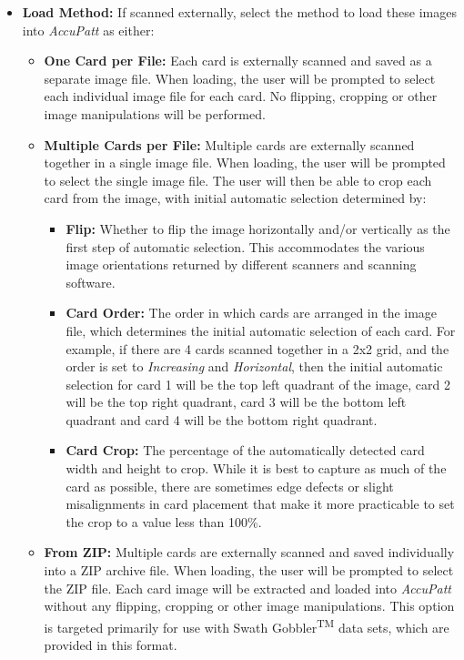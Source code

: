 \documentclass[10pt,letterpaper,titlepage]{article}
\begin{document}
    \begin{itemize}
        \item \textbf{Load Method:} If scanned externally, select the method to load these images into \textit{AccuPatt} as either:
        \begin{itemize}
            \item \textbf{One Card per File:} Each card is externally scanned and saved as a separate image file. When loading, the user will be prompted to select each individual image file for each card. No flipping, cropping or other image manipulations will be performed.
            \item \textbf{Multiple Cards per File:} Multiple cards are externally scanned together in a single image file. When loading, the user will be prompted to select the single image file. The user will then be able to crop each card from the image, with initial automatic selection determined by:
            \begin{itemize}
                \item \textbf{Flip:} Whether to flip the image horizontally and/or vertically as the first step of automatic selection. This accommodates the various image orientations returned by different scanners and scanning software.
                \item \textbf{Card Order:} The order in which cards are arranged in the image file, which determines the initial automatic selection of each card. For example, if there are 4 cards scanned together in a 2x2 grid, and the order is set to \textit{Increasing} and \textit{Horizontal}, then the initial automatic selection for card 1 will be the top left quadrant of the image, card 2 will be the top right quadrant, card 3 will be the bottom left quadrant and card 4 will be the bottom right quadrant.
                \item \textbf{Card Crop:} The percentage of the automatically detected card width and height to crop. While it is best to capture as much of the card as possible, there are sometimes edge defects or slight misalignments in card placement that make it more practicable to set the crop to a value less than 100\%.
            \end{itemize}
            \item \textbf{From ZIP:} Multiple cards are externally scanned and saved individually into a ZIP archive file. When loading, the user will be prompted to select the ZIP file. Each card image will be extracted and loaded into \textit{AccuPatt} without any flipping, cropping or other image manipulations. This option is targeted primarily for use with Swath Gobbler\textsuperscript{TM} data sets, which are provided in this format.
        \end{itemize}
    \end{itemize}
\end{document}
